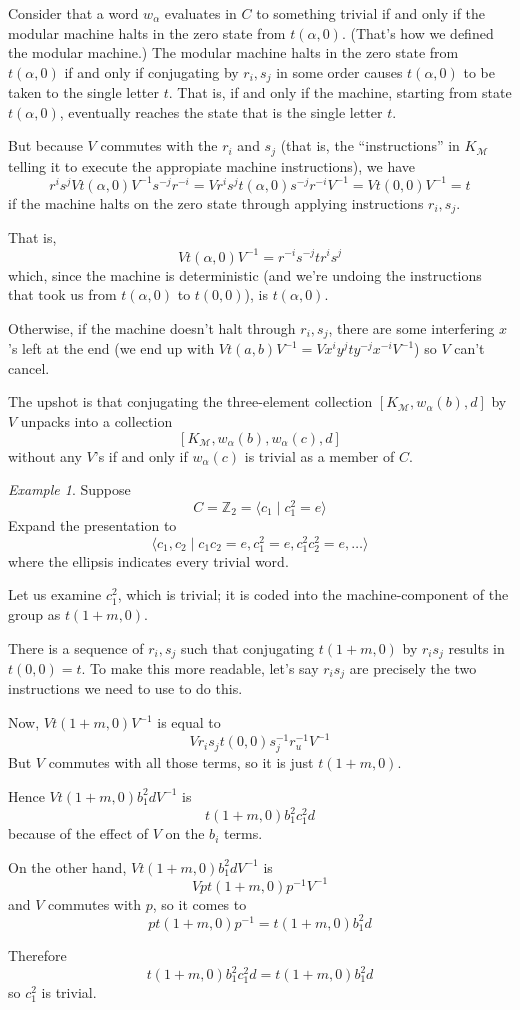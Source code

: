 \documentclass[11pt]{amsart}
\theoremstyle{remark}
\newtheorem*{example}{Example}
\begin{document}
Consider that a word $w_{\alpha}$ evaluates in $C$ to something trivial if and only if the modular machine halts in the zero state from $t(\alpha, 0)$.
(That's how we defined the modular machine.)
The modular machine halts in the zero state from $t(\alpha, 0)$ if and only if conjugating by $r_i, s_j$ in some order causes $t(\alpha,0)$ to be taken to the single letter $t$.
That is, if and only if the machine, starting from state $t(\alpha, 0)$, eventually reaches the state that is the single letter $t$.

But because $V$ commutes with the $r_i$ and $s_j$ (that is, the ``instructions'' in $K_{\mathcal{M}}$ telling it to execute the appropiate machine instructions), we have $$r^i s^j V t(\alpha, 0) V^{-1} s^{-j} r^{-i} = V r^i s^j t(\alpha, 0) s^{-j} r^{-i} V^{-1} = V t(0, 0) V^{-1} = t$$ if the machine halts on the zero state through applying instructions $r_i, s_j$.

That is, $$V t(\alpha, 0) V^{-1} = r^{-i} s^{-j} t r^i s^j$$ which, since the machine is deterministic (and we're undoing the instructions that took us from $t(\alpha, 0)$ to $t(0,0)$), is $t(\alpha, 0)$.

Otherwise, if the machine doesn't halt through $r_i, s_j$, there are some interfering $x$'s left at the end (we end up with $V t(a, b) V^{-1} = V x^i y^j t y^{-j} x^{-i} V^{-1}$) so $V$ can't cancel.

The upshot is that conjugating the three-element collection $[K_{\mathcal{M}}, w_{\alpha}(b), d]$ by $V$ unpacks into a collection $$[K_{\mathcal{M}}, w_{\alpha}(b), w_{\alpha}(c), d]$$ without any $V$'s if and only if $w_{\alpha}(c)$ is trivial as a member of $C$.

\begin{example}
Suppose $$C = \mathbb{Z}_2 = \langle c_1 \mid c_1^2 = e \rangle$$
Expand the presentation to $$\langle c_1, c_2 \mid c_1 c_2 = e, c_1^2 = e, c_1^2 c_2^2 = e, \dots \rangle$$
where the ellipsis indicates every trivial word.

Let us examine $c_1^2$, which is trivial; it is coded into the machine-component of the group as $t(1+m, 0)$.

There is a sequence of $r_i, s_j$ such that conjugating $t(1+m, 0)$ by $r_i s_j$ results in $t(0,0)=t$.
To make this more readable, let's say $r_i s_j$ are precisely the two instructions we need to use to do this.

Now, $V t(1+m, 0) V^{-1}$ is equal to $$V r_i s_j t(0,0) s_j^{-1} r_u^{-1} V^{-1}$$
But $V$ commutes with all those terms, so it is just $t(1+m, 0)$.

Hence $V t(1+m, 0) b_1^2 d V^{-1}$ is $$t(1+m, 0) b_1^2 c_1^2 d$$
because of the effect of $V$ on the $b_i$ terms.

On the other hand, $V t(1+m, 0) b_1^2 d V^{-1}$ is $$V p t(1+m, 0) p^{-1} V^{-1}$$
and $V$ commutes with $p$, so it comes to $$p t(1+m, 0) p^{-1} = t(1+m, 0) b_1^2 d$$

Therefore $$t(1+m, 0) b_1^2 c_1^2 d = t(1+m, 0) b_1^2 d$$
so $c_1^2$ is trivial.
\end{example}
\end{document}
